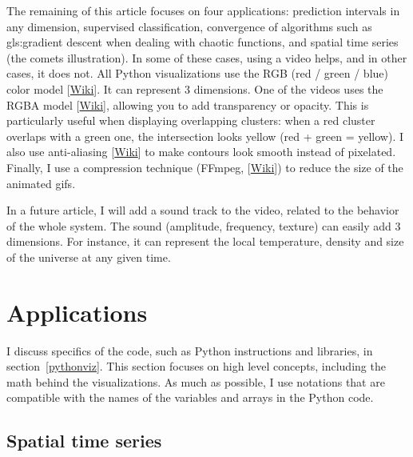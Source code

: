 \documentclass[oneside,10pt]{book}
\begin{document}
The remaining of this article focuses on four applications: prediction intervals in any dimension, supervised classification, convergence of algorithms such as \gls{gls:gradient} descent when dealing with chaotic functions, and spatial time series (the comets illustration). In some of these cases, using a video helps, and in other cases, it does not. All Python visualizations use the \textcolor{index}{RGB} (red / green / blue) color model [\href{https://en.wikipedia.org/wiki/RGB_color_model}{Wiki}]. It can represent 3 dimensions.
One of the videos uses the \textcolor{index}{RGBA} model [\href{https://en.wikipedia.org/wiki/RGBA_color_model}{Wiki}], allowing you to
add transparency or opacity. This is particularly useful when displaying overlapping clusters: when a red cluster overlaps with a green one, the intersection looks yellow (red + green = yellow). 
I also use 
\textcolor{index}{anti-aliasing}
 [\href{https://en.wikipedia.org/wiki/Anti-aliasing}{Wiki}] to make contours look smooth instead of pixelated. Finally, I use a compression technique (\textcolor{index}{FFmpeg}, [\href{https://en.wikipedia.org/wiki/FFmpeg}{Wiki}]) to reduce the size of the animated gifs.

In a future article, I will add a sound track to the video, related to the behavior of the whole system. The sound (amplitude, frequency, texture) can easily add 3 dimensions. For instance, it can represent the local temperature, density and size of the universe at any given time.

\section{Applications}

I discuss specifics of the code, such as Python instructions and libraries, in section~\ref{pythonviz}. This section focuses on high level concepts, including the math behind the visualizations. As much as possible, I use notations that are compatible with the names of the variables and arrays in the Python code.

\subsection{Spatial time series}\label{ellipser}
\end{document}
